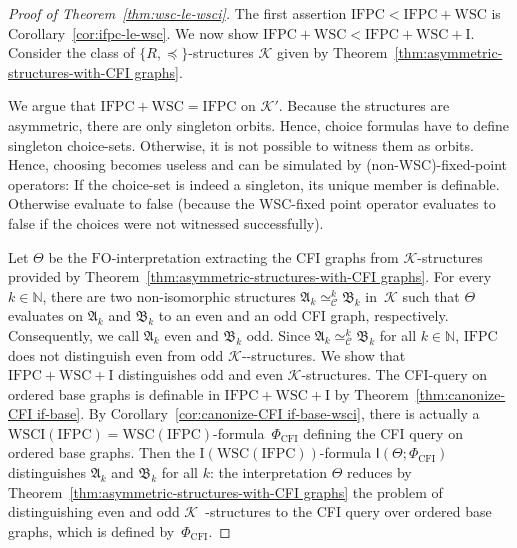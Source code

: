 \documentclass[10pt,a4paper]{amsart}
\providecommand{\nobreakdash}{\nobreak\hbox{-}}
\newcommand{\FO}{\ensuremath{\mathrm{FO}}}
\newcommand{\GraphClass}{\mathcal{K}}
\newcommand{\IFPC}{\ensuremath{\mathrm{IFPC}}}
\newcommand{\IFPCWSC}{\ensuremath{\mathrm{IFPC{+}WSC}}}
\newcommand{\IFPCWSCI}{\ensuremath{\mathrm{IFPC{+}WSC{+}I}}}
\newcommand{\Iof}[1]{\mathrm{I}(#1)}
\newcommand{\Struct}{\mathfrak{A}}
\newcommand{\StructA}{\mathfrak{A}}
\newcommand{\StructB}{\mathfrak{B}}
\newcommand{\WSCIof}[1]{\mathrm{WSCI}(#1)}
\newcommand{\WSCof}[1]{\mathrm{WSC}(#1)}
\newcommand{\formA}{\Phi}
\newcommand{\interpret}{\Theta}
\newcommand{\iop}[2]{\mathsf{I}(#1;#2)}
\newcommand{\kequiv}[1]{\simeq^#1_{\mathcal{C}}}
\newcommand{\nat}{\mathbb{N}}
\newcommand{\set}[1]{\lbrace #1 \rbrace}
\newcommand{\spleq}{\preceq}
\begin{document}
\begin{proof}[Proof of Theorem~\ref{thm:wsc-le-wsci}]
	The first assertion $\IFPC{} < \IFPCWSC{}$ is Corollary~\ref{cor:ifpc-le-wsc}.
	We now show $\IFPCWSC < \IFPCWSCI{}$.
	Consider the class of $\set{R,\spleq}$-structures $\GraphClass$ given by Theorem~\ref{thm:asymmetric-structures-with-CFI graphs}.
	
	We argue that $\IFPCWSC{}=\IFPC$ on $\GraphClass'$.
	Because the structures are asymmetric, there are only singleton orbits.
	Hence, choice formulas have to define singleton choice-sets. Otherwise, it is not possible to witness them as orbits.
	Hence, choosing becomes useless and can be simulated by (non-WSC)-fixed-point operators: If the choice-set is indeed a singleton,
	its unique member is definable.
	Otherwise evaluate to false (because the WSC-fixed point operator evaluates to false if the choices were not witnessed successfully).


	Let $\interpret$ be the \FO-interpretation
	extracting the CFI graphs from $\GraphClass$-structures provided by Theorem~\ref{thm:asymmetric-structures-with-CFI graphs}.
	For every $k\in \nat$, there are two non-isomorphic structures
	$\StructA_k \kequiv{k} \StructB_k$ in~$\GraphClass$
	such that $\interpret$ evaluates on $\StructA_k$ and $\StructB_k$ to an even and an odd CFI graph, respectively.
	Consequently, we call $\Struct_k$ even and $\StructB_k$ odd.
	Since $\StructA_k \kequiv{k} \StructB_k$ for all $k\in\nat$,
	\IFPC{} does not distinguish even from odd $\GraphClass$\nobreakdash-structures.
	We show  that \IFPCWSCI{} distinguishes odd and even $\GraphClass$-structures.
	The CFI-query on ordered base graphs is definable in \IFPCWSCI{} by Theorem~\ref{thm:canonize-CFI if-base}.
	By Corollary~\ref{cor:canonize-CFI if-base-wsci},
	there is actually a $\WSCIof{\IFPC{}}=\WSCof{\IFPC}$-formula~$\formA_{\text{CFI}}$
	defining the CFI query on ordered base graphs.
	Then the $\Iof{\WSCof{\IFPC}}$-formula
	$\iop{\interpret}{\formA_{\text{CFI}}}$
	distinguishes $\StructA_k$ and $\StructB_k$ for all $k$: the interpretation $\interpret$ reduces by Theorem~\ref{thm:asymmetric-structures-with-CFI graphs}
	the problem of distinguishing even and odd $\GraphClass$~\nobreakdash structures to the  CFI query over ordered base graphs,
	which is defined by~$\formA_{\text{CFI}}$.
\end{proof}
\end{document}
